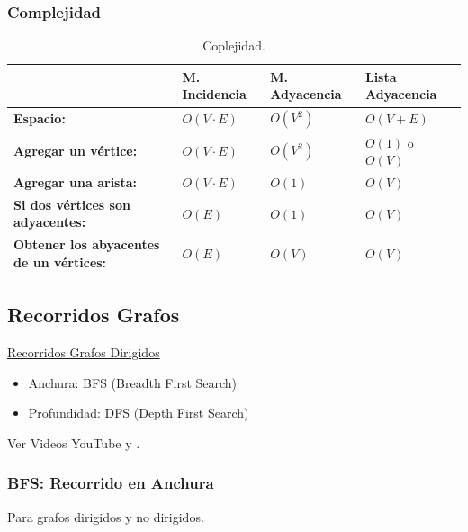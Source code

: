 \documentclass[../main.tex]{subfiles}
\begin{document}
            \newpage

            \subsubsection{Complejidad}
    
                \begin{table}[ht]
                    \centering
                    \begin{tabular}{|l|l|l|l|}
                    \hline
                        & M. Incidencia & M. Adyacencia & Lista Adyacencia\\ \hline
                        \textbf{Espacio:} & $O(V \cdot E)$ & $O(V^2)$ & $O(V + E)$\\ \hline
                        \textbf{Agregar un vértice:}  & $O(V \cdot E)$ & $O(V^2)$ & $O(1)$ o $O(V)$\\ \hline
                        \textbf{Agregar una arista:} & $O(V \cdot E)$ & $O(1)$ & $O(V)$ \\ \hline
                        \textbf{Si dos vértices son adyacentes:} & $O(E)$ & $O(1)$ & $O(V)$\\ \hline
                        \textbf{Obtener los abyacentes de un vértices:} & $O(E)$ & $O(V)$ & $O(V)$\\ \hline
                    \end{tabular}
                    \caption[short]{Coplejidad.}
                \end{table}

        \subsection{Recorridos Grafos}
            \underline{Recorridos Grafos Dirigidos}
            \begin{itemize}
                \item Anchura: BFS (Breadth First Search)
                \item Profundidad: DFS (Depth First Search)
            \end{itemize}

            Ver Videos YouTube \cite{grafo_bfs_dfs_youtube_1} y \cite{grafo_bfs_dfs_youtube_2}.

            \subsubsection{BFS: Recorrido en Anchura}
                Para grafos dirigidos y no dirigidos.\\
                
\end{document}
